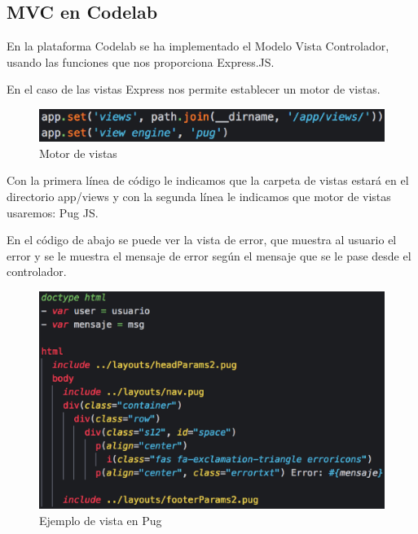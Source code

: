 \subsection{MVC en Codelab}
\label{3:3:2}

En la plataforma Codelab se ha implementado el Modelo Vista Controlador,
usando las funciones que nos proporciona Express.JS.

En el caso de las vistas Express nos permite establecer un motor de vistas.

\begin{figure}[!th]
\begin{center}
\includegraphics[scale=1.0]{images/defvistas}
\caption{Motor de vistas}
\label{fig:Motor de vistas}
\end{center}
\end{figure}

Con la primera línea de código le indicamos que la carpeta de vistas estará en el directorio app/views y con la segunda línea le indicamos que motor de vistas usaremos: Pug JS. 

En el código de abajo se puede ver la vista de error, que muestra al usuario el error y se le muestra el mensaje de error según el mensaje que se le pase desde el controlador.

\begin{figure}[!th]
\begin{center}
\includegraphics[scale=0.5]{images/vista}
\caption{Ejemplo de vista en Pug}
\label{fig:Ejemplo de vista en Pug}
\end{center}
\end{figure}

